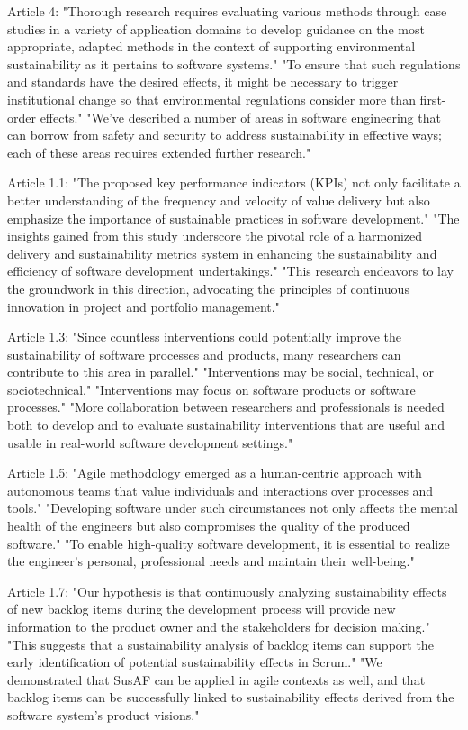 \begin{itemize}
Article 4:
"Thorough research requires evaluating various methods through case studies in a variety of application domains to develop guidance on the most appropriate, adapted methods in the context of supporting environmental sustainability as it pertains to software systems." 
"To ensure that such regulations and standards have the desired effects, it might be necessary to trigger institutional change so that environmental regulations consider more than first-order effects." 
"We’ve described a number of areas in software engineering that can borrow from safety and security to address sustainability in effective ways; each of these areas requires extended further research." 

Article 1.1:
"The proposed key performance indicators (KPIs) not only facilitate a better understanding of the frequency and velocity of value delivery but also emphasize the importance of sustainable practices in software development." 
"The insights gained from this study underscore the pivotal role of a harmonized delivery and sustainability metrics system in enhancing the sustainability and efficiency of software development undertakings." 
"This research endeavors to lay the groundwork in this direction, advocating the principles of continuous innovation in project and portfolio management." 

Article 1.3:
"Since countless interventions could potentially improve the sustainability of software processes and products, many researchers can contribute to this area in parallel." 
"Interventions may be social, technical, or sociotechnical." 
"Interventions may focus on software products or software processes." 
"More collaboration between researchers and professionals is needed both to develop and to evaluate sustainability interventions that are useful and usable in real-world software development settings." 

Article 1.5:
"Agile methodology emerged as a human-centric approach with autonomous teams that value individuals and interactions over processes and tools." 
"Developing software under such circumstances not only affects the mental health of the engineers but also compromises the quality of the produced software." 
"To enable high-quality software development, it is essential to realize the engineer’s personal, professional needs and maintain their well-being."

Article 1.7:
"Our hypothesis is that continuously analyzing sustainability effects of new backlog items during the development process will provide new information to the product owner and the stakeholders for decision making." 
"This suggests that a sustainability analysis of backlog items can support the early identification of potential sustainability effects in Scrum." 
"We demonstrated that SusAF can be applied in agile contexts as well, and that backlog items can be successfully linked to sustainability effects derived from the software system’s product visions."


\end{itemize}
